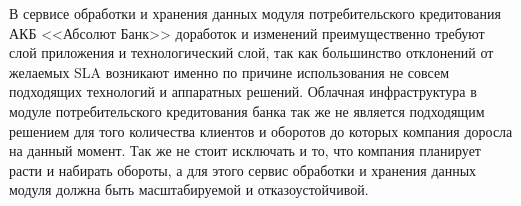 \documentclass[14pt, a4paper]{extarticle}
\begin{document}





В сервисе обработки и хранения данных модуля потребительского кредитования АКБ
<<Абсолют Банк>> доработок и изменений преимущественно
требуют слой приложения и технологический слой, так как большинство отклонений
от желаемых SLA возникают именно по причине использования не совсем подходящих
технологий и аппаратных решений. Облачная инфраструктура в модуле
потребительского кредитования банка так же не является подходящим решением для
того количества клиентов и оборотов до которых компания доросла на данный
момент. Так же не стоит исключать и то, что компания планирует расти и набирать
обороты, а для этого сервис обработки и хранения данных модуля должна быть
масштабируемой и отказоустойчивой.
\end{document}
